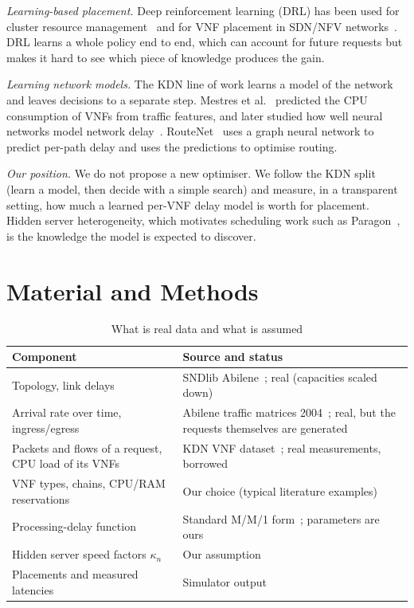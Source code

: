 \documentclass[conference,a4paper]{IEEEtran}
\begin{document}
\emph{Learning-based placement.} Deep reinforcement learning (DRL) has been used for cluster resource
management~\cite{mao2016deeprm} and for VNF placement in SDN/NFV networks~\cite{pei2020drl}. DRL learns a whole
policy end to end, which can account for future requests but makes it hard to see which piece of knowledge produces
the gain.

\emph{Learning network models.} The KDN line of work learns a model of the network and leaves decisions to a
separate step. Mestres et al.~\cite{mestres2017kdn} predicted the CPU consumption of VNFs from traffic features, and
later studied how well neural networks model network delay~\cite{mestres2018delay}. RouteNet~\cite{rusek2020routenet}
uses a graph neural network to predict per-path delay and uses the predictions to optimise routing.

\emph{Our position.} We do not propose a new optimiser. We follow the KDN split (learn a model, then decide with
a simple search) and measure, in a transparent setting, how much a learned per-VNF delay model is worth for
placement. Hidden server heterogeneity, which motivates scheduling work such as Paragon~\cite{delimitrou2013paragon},
is the knowledge the model is expected to discover.

\section{Material and Methods}

\begin{table}[t]
\caption{What is real data and what is assumed}
\label{tab:real}
\centering
\footnotesize
\begin{tabular}{@{}>{\raggedright\arraybackslash}p{}>{\raggedright\arraybackslash}p{}@{}}
\toprule
Component & Source and status \\
\midrule
Topology, link delays & SNDlib Abilene~\cite{orlowski2010sndlib}; real (capacities scaled down) \\
Arrival rate over time, ingress/egress & Abilene traffic matrices 2004~\cite{zhang2005anomography}; real, but the
requests themselves are generated \\
Packets and flows of a request, CPU load of its VNFs & KDN VNF dataset~\cite{mestres2017kdn}; real measurements,
borrowed \\
VNF types, chains, CPU/RAM reservations & Our choice (typical literature examples) \\
Processing-delay function & Standard M/M/1 form~\cite{kleinrock1975queueing}; parameters are ours \\
Hidden server speed factors $\kappa_n$ & Our assumption \\
Placements and measured latencies & Simulator output \\
\bottomrule
\end{tabular}
\end{table}
\end{document}
